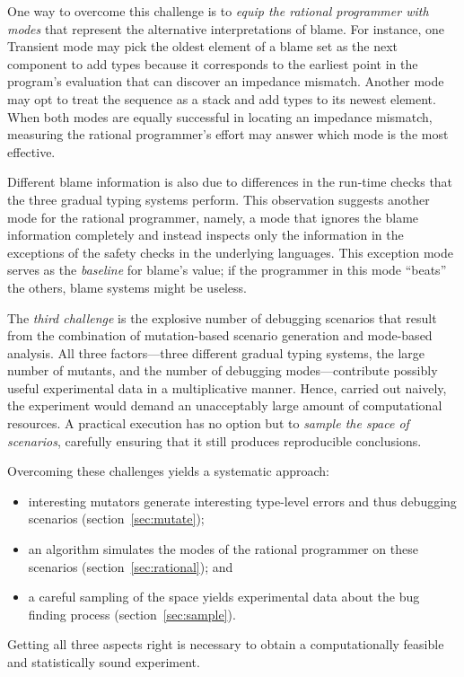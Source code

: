 One way to overcome this challenge is to {\em equip the rational programmer with
modes \/} that represent the alternative interpretations of blame.  For
instance, one Transient mode may pick the oldest element of a blame set as
the next component to add types because it corresponds to the earliest point in
the program's evaluation that can discover an impedance mismatch.  Another mode
may opt to treat the sequence as a stack and add types to its newest element.
When both modes are equally successful in locating an impedance mismatch,
measuring the rational programmer's effort may answer which mode is the most
effective.

Different blame information is also due to differences in the run-time checks
that the three gradual typing systems perform. This observation suggests another
mode for the rational programmer, namely, a mode that ignores the blame
information completely and instead inspects only the information in the
exceptions of the safety checks in the underlying languages.  This exception
mode serves as the {\em baseline\/} for blame's value; if the programmer in this
mode ``beats'' the others, blame systems might be useless.

The {\em third challenge\/} is the explosive number of debugging scenarios that
result from the combination of mutation-based scenario generation and mode-based
analysis. All three factors---three different gradual typing systems, the large
number of mutants, and the number of debugging modes---contribute possibly
useful experimental data in a multiplicative manner. Hence, carried out naively,
the experiment would demand an unacceptably large amount of computational
resources.  A practical execution has no option but to {\em sample the space of
scenarios\/}, carefully ensuring that it still produces reproducible
conclusions.

Overcoming these challenges yields a systematic approach: 
\begin{itemize}

\item interesting mutators generate interesting type-level errors and thus
debugging scenarios (section~\ref{sec:mutate});
    
\item an algorithm simulates the modes of the rational programmer on these
scenarios (section~\ref{sec:rational}); and

\item a careful sampling of the space yields experimental
data about the bug finding process (section~\ref{sec:sample}).
\end{itemize}
Getting all three aspects right is necessary to obtain a computationally
feasible and statistically sound experiment.

